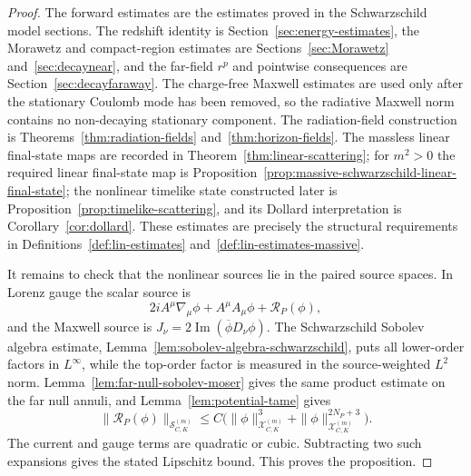 \documentclass[11pt]{article}
\numberwithin{equation}{section}
\theoremstyle{plain}
\theoremstyle{definition}
\theoremstyle{remark}
\begin{document}
\begin{proof}
The forward estimates are the estimates proved in the Schwarzschild model sections.  The redshift identity is Section~\ref{sec:energy-estimates}, the Morawetz and compact-region estimates are Sections~\ref{sec:Morawetz} and~\ref{sec:decaynear}, and the far-field $r^p$ and pointwise consequences are Section~\ref{sec:decayfaraway}.  The charge-free Maxwell estimates are used only after the stationary Coulomb mode has been removed, so the radiative Maxwell norm contains no non-decaying stationary component.  The radiation-field construction is Theorems~\ref{thm:radiation-fields} and~\ref{thm:horizon-fields}.  The massless linear final-state maps are recorded in Theorem~\ref{thm:linear-scattering}; for $m^2>0$ the required linear final-state map is Proposition~\ref{prop:massive-schwarzschild-linear-final-state}; the nonlinear timelike state constructed later is Proposition~\ref{prop:timelike-scattering}, and its Dollard interpretation is Corollary~\ref{cor:dollard}.  These estimates are precisely the structural requirements in Definitions~\ref{def:lin-estimates} and~\ref{def:lin-estimates-massive}.

It remains to check that the nonlinear sources lie in the paired source spaces.  In Lorenz gauge the scalar source is
\begin{equation}
 2iA^\mu\nabla_\mu\phi+A^\mu A_\mu\phi+\mathcal R_P(\phi),
\end{equation}
and the Maxwell source is $J_\nu=2\operatorname{Im}(\overline\phi D_\nu\phi)$.  The Schwarzschild Sobolev algebra estimate, Lemma~\ref{lem:sobolev-algebra-schwarzschild}, puts all lower-order factors in $L^\infty$, while the top-order factor is measured in the source-weighted $L^2$ norm.  Lemma~\ref{lem:far-null-sobolev-moser} gives the same product estimate on the far null annuli, and Lemma~\ref{lem:potential-tame} gives
\begin{equation}
 \|\mathcal R_P(\phi)\|_{\mathcal S^{(m)}_{C,K}}
 \le C\bigl(\|\phi\|_{\mathcal X^{(m)}_{C,K}}^3+
 \|\phi\|_{\mathcal X^{(m)}_{C,K}}^{2N_P+3}\bigr).
\end{equation}
The current and gauge terms are quadratic or cubic.  Subtracting two such expansions gives the stated Lipschitz bound.  This proves the proposition.
\end{proof}
\end{document}
